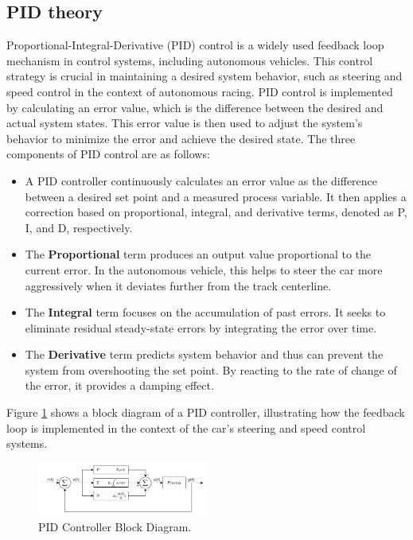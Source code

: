 \documentclass[conference]{IEEEtran}
\begin{document}
\subsection{PID theory}

Proportional-Integral-Derivative (PID) control is a widely used feedback loop mechanism in control systems, including autonomous vehicles. This control strategy is crucial in maintaining a desired system behavior, such as steering and speed control in the context of autonomous racing. PID control is implemented by calculating an error value, which is the difference between the desired and actual system states. This error value is then used to adjust the system's behavior to minimize the error and achieve the desired state. The three components of PID control are as follows:

\begin{itemize}
	\item A PID controller continuously calculates an error value as the difference between a desired set point and a measured process variable. It then applies a correction based on proportional, integral, and derivative terms, denoted as P, I, and D, respectively.
	\item The \textbf{Proportional} term produces an output value proportional to the current error. In the autonomous vehicle, this helps to steer the car more aggressively when it deviates further from the track centerline.
	\item The \textbf{Integral} term focuses on the accumulation of past errors. It seeks to eliminate residual steady-state errors by integrating the error over time.
	\item The \textbf{Derivative} term predicts system behavior and thus can prevent the system from overshooting the set point. By reacting to the rate of change of the error, it provides a damping effect.
\end{itemize}

Figure \ref{fig:PID} shows a block diagram of a PID controller, illustrating how the feedback loop is implemented in the context of the car's steering and speed control systems.

\begin{figure}[htbp]
	\centerline{\includegraphics[width=0.5\textwidth]{images/pid.png}}
	\caption{PID Controller Block Diagram.}
	\label{fig:PID}
\end{figure}
\end{document}

